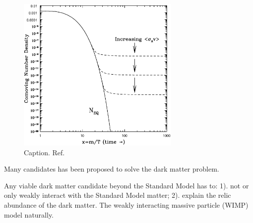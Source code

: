 \documentclass[doublespace,nopageskip]{VTthesis} %
\begin{document}
\begin{figure}[hbt]
    \centering
    \includegraphics[width=0.7\textwidth]{Figures/Intro/freezeout.ps}
    \caption{Caption. Ref.~\cite{2009arXiv0901.4090H}}
    \label{fig:my_label}
\end{figure}

Many candidates has been proposed to solve the dark matter problem. 

Any viable dark matter candidate beyond the Standard Model has to: 1). not or only weakly interact with the Standard Model matter; 2). explain the relic abundance of the dark matter. The weakly interacting massive particle (WIMP) model naturally.
\end{document}
